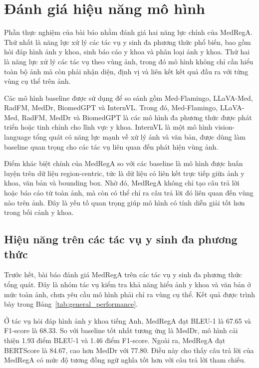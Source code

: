 \documentclass[12pt,a4paper,oneside]{extarticle}
\begin{document}
\section{Đánh giá hiệu năng mô hình}

Phần thực nghiệm của bài báo nhằm đánh giá hai năng lực chính của MedRegA. Thứ nhất là năng lực xử lý các tác vụ y sinh đa phương thức phổ biến, bao gồm hỏi đáp hình ảnh y khoa, sinh báo cáo y khoa và phân loại ảnh y khoa. Thứ hai là năng lực xử lý các tác vụ theo vùng ảnh, trong đó mô hình không chỉ cần hiểu toàn bộ ảnh mà còn phải nhận diện, định vị và liên kết kết quả đầu ra với từng vùng cụ thể trên ảnh.

Các mô hình baseline được sử dụng để so sánh gồm Med-Flamingo, LLaVA-Med, RadFM, MedDr, BiomedGPT và InternVL. Trong đó, Med-Flamingo, LLaVA-Med, RadFM, MedDr và BiomedGPT là các mô hình đa phương thức được phát triển hoặc tinh chỉnh cho lĩnh vực y khoa. InternVL là một mô hình vision-language tổng quát có năng lực mạnh về xử lý ảnh và văn bản, được dùng làm baseline quan trọng cho các tác vụ liên quan đến phát hiện vùng ảnh.

Điểm khác biệt chính của MedRegA so với các baseline là mô hình được huấn luyện trên dữ liệu region-centric, tức là dữ liệu có liên kết trực tiếp giữa ảnh y khoa, văn bản và bounding box. Nhờ đó, MedRegA không chỉ tạo câu trả lời hoặc báo cáo từ toàn ảnh, mà còn có thể chỉ ra câu trả lời đó liên quan đến vùng nào trên ảnh. Đây là yếu tố quan trọng giúp mô hình có tính diễn giải tốt hơn trong bối cảnh y khoa.

\subsection{Hiệu năng trên các tác vụ y sinh đa phương thức}

Trước hết, bài báo đánh giá MedRegA trên các tác vụ y sinh đa phương thức tổng quát. Đây là nhóm tác vụ kiểm tra khả năng hiểu ảnh y khoa và văn bản ở mức toàn ảnh, chưa yêu cầu mô hình phải chỉ ra vùng cụ thể. Kết quả được trình bày trong Bảng~\ref{tab:general_performance}.

Ở tác vụ hỏi đáp hình ảnh y khoa tiếng Anh, MedRegA đạt BLEU-1 là 67.65 và F1-score là 68.33. So với baseline tốt nhất tương ứng là MedDr, mô hình cải thiện 1.93 điểm BLEU-1 và 1.46 điểm F1-score. Ngoài ra, MedRegA đạt BERTScore là 84.67, cao hơn MedDr với 77.80. Điều này cho thấy câu trả lời của MedRegA có mức độ tương đồng ngữ nghĩa tốt hơn với câu trả lời tham chiếu.
\end{document}
